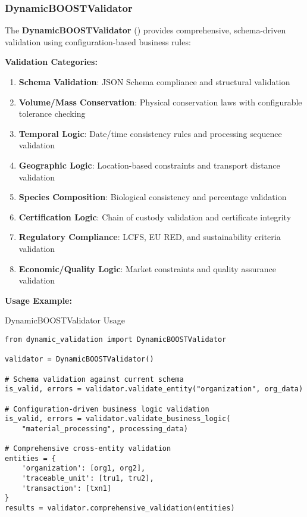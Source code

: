 \subsubsection{DynamicBOOSTValidator}
\label{sec:python-validator}

The \textbf{DynamicBOOSTValidator} () provides comprehensive, schema-driven validation using configuration-based business rules:

\textbf{Validation Categories:}
\begin{enumerate}
    \item \textbf{Schema Validation}: JSON Schema compliance and structural validation
    \item \textbf{Volume/Mass Conservation}: Physical conservation laws with configurable tolerance checking
    \item \textbf{Temporal Logic}: Date/time consistency rules and processing sequence validation
    \item \textbf{Geographic Logic}: Location-based constraints and transport distance validation
    \item \textbf{Species Composition}: Biological consistency and percentage validation
    \item \textbf{Certification Logic}: Chain of custody validation and certificate integrity
    \item \textbf{Regulatory Compliance}: LCFS, EU RED, and sustainability criteria validation
    \item \textbf{Economic/Quality Logic}: Market constraints and quality assurance validation
\end{enumerate}

\textbf{Usage Example:}

\begin{pythonexample}{DynamicBOOSTValidator Usage}
\begin{verbatim}
from dynamic_validation import DynamicBOOSTValidator

validator = DynamicBOOSTValidator()

# Schema validation against current schema
is_valid, errors = validator.validate_entity("organization", org_data)

# Configuration-driven business logic validation
is_valid, errors = validator.validate_business_logic(
    "material_processing", processing_data)

# Comprehensive cross-entity validation
entities = {
    'organization': [org1, org2],
    'traceable_unit': [tru1, tru2],
    'transaction': [txn1]
}
results = validator.comprehensive_validation(entities)
\end{verbatim}
\end{pythonexample}

